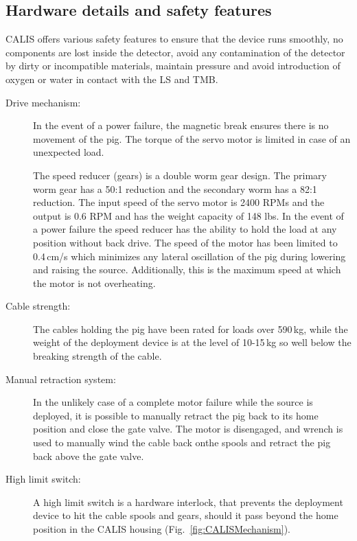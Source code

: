 \subsection{Hardware details and safety features}\label{sec:HardwareDetails}\label{sec:SafetyFeatures}
CALIS offers various safety features to ensure that the device runs smoothly, no components are lost inside the detector, avoid any contamination of the detector by dirty or incompatible materials, maintain pressure and avoid introduction of oxygen or water in contact with the LS and TMB. %

\begin{description}

\item[Drive mechanism:]
In the event of a power failure, the magnetic break ensures there is no movement of the pig. The torque of the servo motor is limited in case of an unexpected load. 

The speed reducer (gears) is a double worm gear design. The primary worm gear has a 50:1 reduction and the secondary worm has a 82:1 reduction. The input speed of the servo motor is 2400 RPMs and the output is 0.6 RPM and has the weight capacity of 148 lbs. In the event of a power failure the speed reducer has the ability to hold the load at any position without back drive. The speed of the motor has been limited to 0.4\,cm/s which minimizes any lateral oscillation of the pig during lowering and raising the source. Additionally, this is the maximum speed at which the motor is not overheating.

\item[Cable strength:]
The cables holding the pig have been rated for loads over 590\,kg, while the weight of the deployment device is at the level of 10-15\,kg so well below the breaking strength of the cable. 

\item[Manual retraction system:]
In the unlikely case of a complete motor failure while the source is deployed, it is possible to manually retract the pig back to its home position and close the gate valve. The motor is disengaged, and wrench is used to manually wind the cable back onthe spools and retract the pig back above the gate valve. 
   
\item[High limit switch:]
A high limit switch is a hardware interlock, that prevents the deployment device to hit the cable spools and gears, should it pass beyond the home position in the CALIS housing (Fig.~\ref{fig:CALISMechanism}). 


\end{description}
